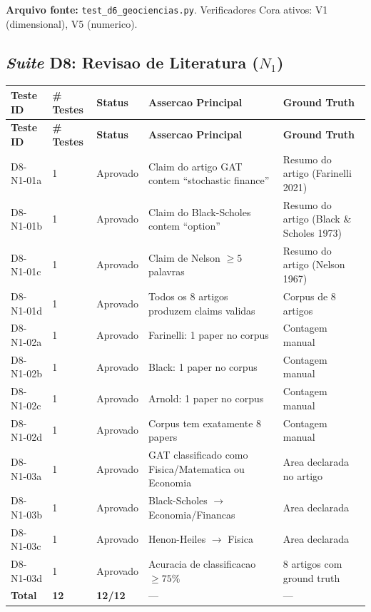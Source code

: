 \textbf{Arquivo fonte:} \texttt{test\_d6\_geociencias.py}. Verificadores Cora ativos: V1 (dimensional), V5 (numerico).

\subsection{\textit{Suite} D8: Revisao de Literatura ($N_1$)}

\begin{longtable}{|p{2.5cm}|p{2.0cm}|p{2.0cm}|p{3.5cm}|p{3.5cm}|}
\hline
\textbf{Teste ID} & \textbf{\# Testes} & \textbf{Status} & \textbf{Assercao Principal} & \textbf{Ground Truth} \\
\hline
\endfirsthead
\hline
\textbf{Teste ID} & \textbf{\# Testes} & \textbf{Status} & \textbf{Assercao Principal} & \textbf{Ground Truth} \\
\hline
\endhead
\hline
\endfoot
D8-N1-01a & 1 & Aprovado & Claim do artigo GAT contem ``stochastic finance'' & Resumo do artigo (Farinelli 2021) \\
\hline
D8-N1-01b & 1 & Aprovado & Claim do Black-Scholes contem ``option'' & Resumo do artigo (Black \& Scholes 1973) \\
\hline
D8-N1-01c & 1 & Aprovado & Claim de Nelson $\geq 5$ palavras & Resumo do artigo (Nelson 1967) \\
\hline
D8-N1-01d & 1 & Aprovado & Todos os 8 artigos produzem claims validas & Corpus de 8 artigos \\
\hline
D8-N1-02a & 1 & Aprovado & Farinelli: 1 paper no corpus & Contagem manual \\
\hline
D8-N1-02b & 1 & Aprovado & Black: 1 paper no corpus & Contagem manual \\
\hline
D8-N1-02c & 1 & Aprovado & Arnold: 1 paper no corpus & Contagem manual \\
\hline
D8-N1-02d & 1 & Aprovado & Corpus tem exatamente 8 papers & Contagem manual \\
\hline
D8-N1-03a & 1 & Aprovado & GAT classificado como Fisica/Matematica ou Economia & Area declarada no artigo \\
\hline
D8-N1-03b & 1 & Aprovado & Black-Scholes $\rightarrow$ Economia/Financas & Area declarada \\
\hline
D8-N1-03c & 1 & Aprovado & Henon-Heiles $\rightarrow$ Fisica & Area declarada \\
\hline
D8-N1-03d & 1 & Aprovado & Acuracia de classificacao $\geq 75\%$ & 8 artigos com ground truth \\
\hline
\textbf{Total} & \textbf{12} & \textbf{12/12} & --- & --- \\
\hline
\end{longtable}

